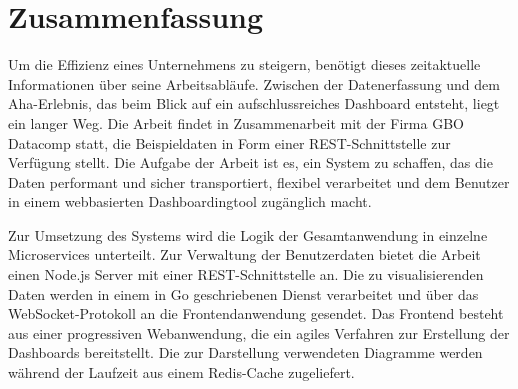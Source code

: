 \chapter*{Zusammenfassung}
\label{chap:zusammenfassung}

Um die Effizienz eines Unternehmens zu steigern, benötigt dieses zeitaktuelle Informationen über seine Arbeitsabläufe.
Zwischen der Datenerfassung und dem Aha-Erlebnis, das beim Blick auf ein aufschlussreiches Dashboard entsteht, liegt ein
langer Weg. Die Arbeit findet in Zusammenarbeit mit der Firma GBO Datacomp statt, die Beispieldaten
in Form einer REST-Schnittstelle zur Verfügung stellt. Die Aufgabe der Arbeit ist es, ein System zu schaffen,
das die Daten performant und sicher transportiert, flexibel verarbeitet und dem Benutzer
in einem webbasierten Dashboardingtool zugänglich macht. 

Zur Umsetzung des Systems wird die Logik der Gesamtanwendung in einzelne Microservices
unterteilt. Zur Verwaltung der Benutzerdaten bietet die Arbeit einen Node.js Server
mit einer REST-Schnittstelle an. Die zu visualisierenden Daten werden in einem
in Go geschriebenen Dienst verarbeitet und über das WebSocket-Protokoll an die
Frontendanwendung gesendet. Das Frontend besteht aus einer progressiven Webanwendung,
die ein agiles Verfahren zur Erstellung der Dashboards bereitstellt. Die zur Darstellung
verwendeten Diagramme werden während der Laufzeit aus einem Redis-Cache zugeliefert.

